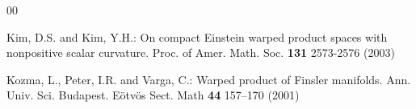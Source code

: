 \documentclass[pdflatex,sn-mathphys-num]{sn-jnl}%
\theoremstyle{thmstyleone}%
\theoremstyle{thmstyletwo}%
\theoremstyle{thmstylethree}%
\begin{document}
\begin{thebibliography}{00}
		
		
  
		 Kim, D.S. and Kim, Y.H.:  On compact Einstein warped product spaces with nonpositive scalar curvature. Proc. of Amer. Math. Soc.  {\bf131}  2573-2576 (2003)
  
  
		 Kozma, L., Peter, I.R. and  Varga, C.:  Warped product of Finsler manifolds. Ann. Univ. Sci. Budapest. E{\"o}tv{\"o}s Sect. Math {\bf44}  157–170 (2001)
  
  
  
  

\end{thebibliography}
\end{document}
